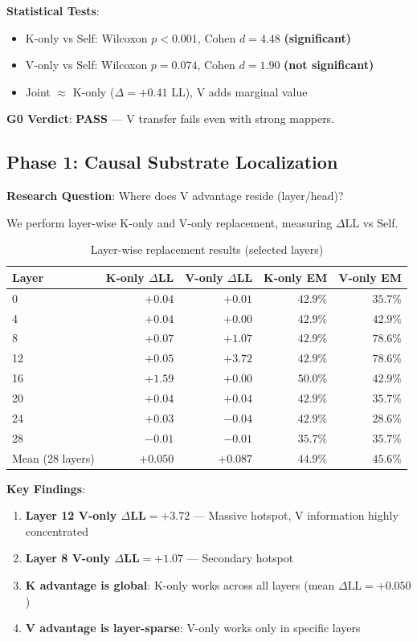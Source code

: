 \documentclass[11pt]{article}
\begin{document}
\textbf{Statistical Tests}:
\begin{itemize}
    \item K-only vs Self: Wilcoxon $p < 0.001$, Cohen $d = 4.48$ \textbf{(significant)}
    \item V-only vs Self: Wilcoxon $p = 0.074$, Cohen $d = 1.90$ \textbf{(not significant)}
    \item Joint $\approx$ K-only ($\Delta = +0.41$ LL), V adds marginal value
\end{itemize}

\textbf{G0 Verdict}: \textbf{PASS} --- V transfer fails even with strong mappers.

\subsection{Phase 1: Causal Substrate Localization}

\textbf{Research Question}: Where does V advantage reside (layer/head)?

We perform layer-wise K-only and V-only replacement, measuring $\Delta$LL vs Self.

\begin{table}[h]
\centering
\caption{Layer-wise replacement results (selected layers)}
\begin{tabular}{lrrrr}
\toprule
Layer & K-only $\Delta$LL & V-only $\Delta$LL & K-only EM & V-only EM \\
\midrule
0 & $+0.04$ & $+0.01$ & $42.9\%$ & $35.7\%$ \\
4 & $+0.04$ & $+0.00$ & $42.9\%$ & $42.9\%$ \\
8 & $+0.07$ & $\mathbf{+1.07}$ & $42.9\%$ & $\mathbf{78.6\%}$ \\
12 & $+0.05$ & $\mathbf{+3.72}$ & $42.9\%$ & $\mathbf{78.6\%}$ \\
16 & $\mathbf{+1.59}$ & $+0.00$ & $\mathbf{50.0\%}$ & $42.9\%$ \\
20 & $+0.04$ & $+0.04$ & $42.9\%$ & $35.7\%$ \\
24 & $+0.03$ & $-0.04$ & $42.9\%$ & $28.6\%$ \\
28 & $-0.01$ & $-0.01$ & $35.7\%$ & $35.7\%$ \\
\midrule
Mean (28 layers) & $+0.050$ & $+0.087$ & $44.9\%$ & $45.6\%$ \\
\bottomrule
\end{tabular}
\end{table}

\textbf{Key Findings}:
\begin{enumerate}
    \item \textbf{Layer 12 V-only $\Delta$LL$=+3.72$} --- Massive hotspot, V information highly concentrated
    \item \textbf{Layer 8 V-only $\Delta$LL$=+1.07$} --- Secondary hotspot
    \item \textbf{K advantage is global}: K-only works across all layers (mean $\Delta$LL$=+0.050$)
    \item \textbf{V advantage is layer-sparse}: V-only works only in specific layers
\end{enumerate}
\end{document}
